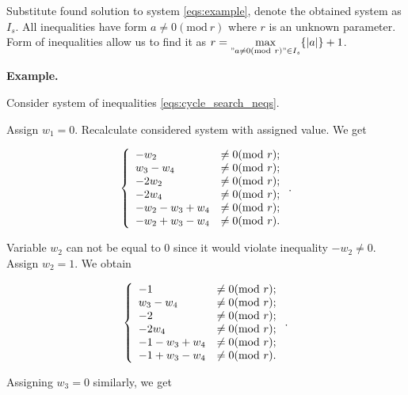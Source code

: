 \documentclass[leqno]{aadmbook}
\renewcommand{\mod}[1]{\textrm{mod}\ #1}
\begin{document}
Substitute found solution to system \eqref{eqs:example}, denote the obtained system as $I_s$. All inequalities have form $a \neq 0 (\mod{r})$ where $r$ is an unknown parameter. Form of inequalities allow us to find it as $r = \max\limits_{"a \neq 0 (\mod{r})" \in I_s}\{ |a| \} + 1$.

\textbf{Example.}

Consider system of inequalities \eqref{eqs:cycle_search_neqs}.

Assign $w_1 = 0$. Recalculate considered system with assigned value. We get

\begin{equation}
    \centering
    \left\{
        \begin{array}{ll}
            - w_2 &\neq 0             (\mod{r}); \\
            w_3 - w_4 &\neq 0         (\mod{r}); \\
            - 2 w_2 &\neq 0           (\mod{r}); \\
            - 2 w_4 &\neq 0           (\mod{r}); \\
            - w_2 - w_3 + w_4 &\neq 0 (\mod{r}); \\
            - w_2 + w_3 - w_4 &\neq 0 (\mod{r}). \\
        \end{array}
    \right..
    \label{eqs:cycle_search_neqs_1}
\end{equation}

Variable $w_2$ can not be equal to $0$ since it would violate inequality $- w_2 \neq 0$. Assign $w_2 = 1$. We obtain

\begin{equation}
    \centering
    \left\{
        \begin{array}{ll}
            - 1 &\neq 0              (\mod{r}); \\
            w_3 - w_4 &\neq 0        (\mod{r}); \\
            - 2 &\neq 0              (\mod{r}); \\
            - 2 w_4 &\neq 0          (\mod{r}); \\
            - 1 - w_3 + w_4 &\neq 0  (\mod{r}); \\
            - 1 + w_3 - w_4 &\neq 0  (\mod{r}). \\
        \end{array}
    \right..
    \label{eqs:cycle_search_neqs_2}
\end{equation}

Assigning $w_3 = 0$ similarly, we get
\end{document}
